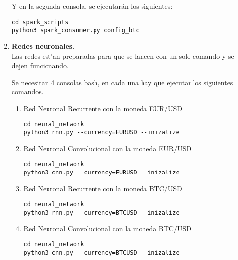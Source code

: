 \begin{enumerate}
Y en la segunda consola, se ejecutarán los siguientes:

\begin{lstlisting}
cd spark_scripts
python3 spark_consumer.py config_btc   
\end{lstlisting}

\item \textbf{Redes neuronales}.\\
Las redes est'an preparadas para que se lancen con un solo comando y se dejen funcionando.

Se necesitan 4 consolas bash, en cada una hay que ejecutar los siguientes comandos.

\begin{enumerate}

\item Red Neuronal Recurrente con la moneda EUR/USD
\begin{lstlisting}
cd neural_network
python3 rnn.py --currency=EURUSD --inizalize
\end{lstlisting}

\item Red Neuronal Convolucional con la moneda EUR/USD
\begin{lstlisting}
cd neural_network
python3 cnn.py --currency=EURUSD --inizalize
\end{lstlisting}

\item Red Neuronal Recurrente con la moneda BTC/USD
\begin{lstlisting}
cd neural_network
python3 rnn.py --currency=BTCUSD --inizalize
\end{lstlisting}

\item Red Neuronal Convolucional con la moneda BTC/USD
\begin{lstlisting}
cd neural_network
python3 cnn.py --currency=BTCUSD --inizalize
\end{lstlisting}


\end{enumerate}
\end{enumerate}
